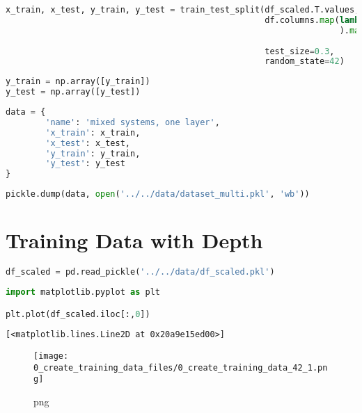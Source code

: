 \begin{lstlisting}[language=Python]
x_train, x_test, y_train, y_test = train_test_split(df_scaled.T.values,
                                                    df.columns.map(lambda x: x.split('_')[:-1]
                                                                   ).map(base.pair_list_to_tuples
                                                                         ).map(base.one_hot_encode_concentrations),
                                                    test_size=0.3,
                                                    random_state=42)
\end{lstlisting}

\begin{lstlisting}[language=Python]
y_train = np.array([y_train])
y_test = np.array([y_test])
\end{lstlisting}

\begin{lstlisting}[language=Python]
data = {
        'name': 'mixed systems, one layer',
        'x_train': x_train,
        'x_test': x_test,
        'y_train': y_train,
        'y_test': y_test
}
\end{lstlisting}

\begin{lstlisting}[language=Python]
pickle.dump(data, open('../../data/dataset_multi.pkl', 'wb'))
\end{lstlisting}

\hypertarget{training-data-with-depth}{%
\section{Training Data with Depth}\label{training-data-with-depth}}

\begin{lstlisting}[language=Python]
df_scaled = pd.read_pickle('../../data/df_scaled.pkl')
\end{lstlisting}

\begin{lstlisting}[language=Python]
import matplotlib.pyplot as plt

plt.plot(df_scaled.iloc[:,0])
\end{lstlisting}

\begin{lstlisting}
[<matplotlib.lines.Line2D at 0x20a9e15ed00>]
\end{lstlisting}

\begin{figure}
\centering
\texttt{[image: 0\_create\_training\_data\_files/0\_create\_training\_data\_42\_1.png]}
\caption{png}
\end{figure}

